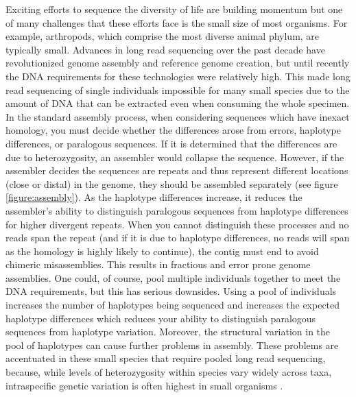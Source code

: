 \par{
Exciting efforts to sequence the diversity of life are building momentum \cite{Lewin2018-lc} but one of many challenges that these efforts face is the small size of most organisms. For example, arthropods, which comprise the most diverse animal phylum, are typically small. Advances in long read sequencing over the past decade have revolutionized genome assembly and reference genome creation\cite{pacbio}\cite{oxford}, but until recently the DNA requirements for these technologies were relatively high. This made long read sequencing of single individuals impossible for many small species due to the amount of DNA that can be extracted even when consuming the whole specimen. In the standard assembly process, when considering sequences which have inexact homology, you must decide whether the differences arose from errors, haplotype differences, or paralogous sequences. If it is determined that the differences are due to heterozygosity, an assembler would collapse the sequence. However, if the assembler decides the sequences are repeats and thus represent different locations (close or distal) in the genome, they should be assembled separately (see figure \ref{figure:assembly}). As the haplotype differences increase, it reduces the assembler's ability to distinguish paralogous sequences from haplotype differences for higher divergent repeats. When you cannot distinguish these processes and no reads span the repeat (and if it is due to haplotype differences, no reads will span as the homology is highly likely to continue), the contig must end to avoid chimeric misassemblies. This results in fractious and error prone genome assemblies. One could, of course, pool multiple individuals together to meet the DNA requirements, but this has serious downsides. Using a pool of individuals increases the number of haplotypes being sequenced and increases the expected haplotype differences which reduces your ability to distinguish paralogous sequences from haplotype variation. Moreover, the structural variation in the pool of haplotypes can cause further problems in assembly. These problems are accentuated in these small species that require pooled long read sequencing, because, while levels of heterozygosity within species vary widely across taxa, intraspecific genetic variation is often highest in small organisms \cite{Leffler2012-uh}. 
}


